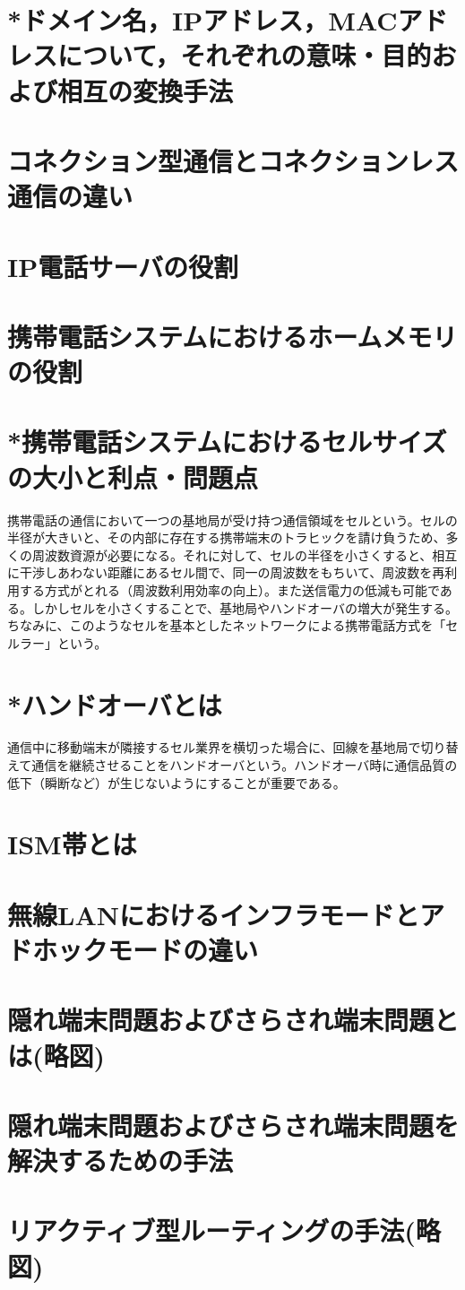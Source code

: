 \documentclass[10.5pt]{jsarticle}
\begin{document}
\section{*ドメイン名，IPアドレス，MACアドレスについて，それぞれの意味・目的および相互の変換手法}



\section{コネクション型通信とコネクションレス通信の違い}


\section{IP電話サーバの役割}


\section{携帯電話システムにおけるホームメモリの役割}


\section{*携帯電話システムにおけるセルサイズの大小と利点・問題点}
携帯電話の通信において一つの基地局が受け持つ通信領域をセルという。セルの半径が大きいと、その内部に存在する携帯端末のトラヒックを請け負うため、多くの周波数資源が必要になる。それに対して、セルの半径を小さくすると、相互に干渉しあわない距離にあるセル間で、同一の周波数をもちいて、周波数を再利用する方式がとれる（周波数利用効率の向上）。また送信電力の低減も可能である。しかしセルを小さくすることで、基地局やハンドオーバの増大が発生する。ちなみに、このようなセルを基本としたネットワークによる携帯電話方式を「セルラー」という。

\section{*ハンドオーバとは}
通信中に移動端末が隣接するセル業界を横切った場合に、回線を基地局で切り替えて通信を継続させることをハンドオーバという。ハンドオーバ時に通信品質の低下（瞬断など）が生じないようにすることが重要である。

\section{ISM帯とは}


\section{無線LANにおけるインフラモードとアドホックモードの違い}


\section{隠れ端末問題およびさらされ端末問題とは(略図)}


\section{隠れ端末問題およびさらされ端末問題を解決するための手法}


\section{リアクティブ型ルーティングの手法(略図)}
\end{document}
